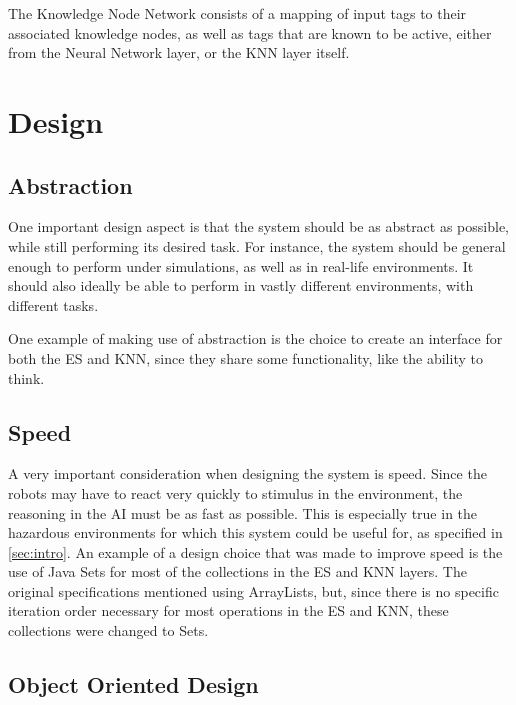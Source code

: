 \documentclass[titlepage,11pt]{article}
\begin{document}
The Knowledge Node Network consists of a mapping of input tags to their associated knowledge nodes, as well as tags that are known to be active, either from the Neural Network layer, or the KNN layer itself.

\section{Design}

\subsection{Abstraction}

One important design aspect is that the system should be as abstract as possible, while still performing its desired task. For instance, the system should be general enough to perform under simulations, as well as in real-life environments. It should also ideally be able to perform in vastly different environments, with different tasks.

One example of making use of abstraction is the choice to create an interface for both the ES and KNN, since they share some functionality, like the ability to think.

\subsection{Speed}

A very important consideration when designing the system is speed. Since the robots may have to react very quickly to stimulus in the environment, the reasoning in the AI must be as fast as possible. This is especially true in the hazardous environments for which this system could be useful for, as specified in \autoref{sec:intro}. An example of a design choice that was made to improve speed is the use of Java Sets for most of the collections in the ES and KNN layers. The original specifications mentioned using ArrayLists, but, since there is no specific iteration order necessary for most operations in the ES and KNN, these collections were changed to Sets.

\subsection{Object Oriented Design}
\end{document}
